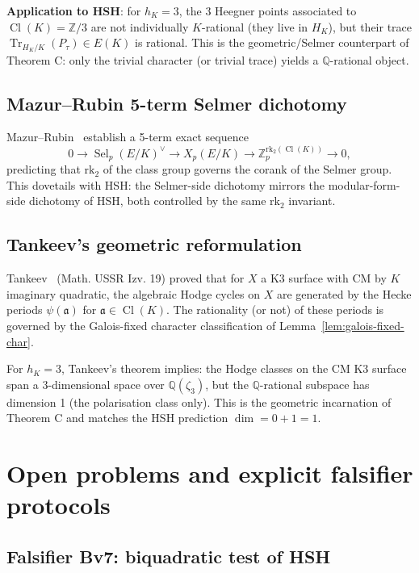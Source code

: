 \documentclass[11pt,a4paper]{amsart}
\theoremstyle{definition}
\DeclareMathOperator{\Tr}{Tr}
\DeclareMathOperator{\Cl}{Cl}
\DeclareMathOperator{\Sel}{Sel}
\newcommand{\Q}{\mathbb{Q}}
\newcommand{\Z}{\mathbb{Z}}
\newcommand{\fa}{\mathfrak{a}}
\newcommand{\hK}{h_{K}}
\newcommand{\rktwo}{\mathrm{rk}_2}
\begin{document}
\textbf{Application to HSH}: for $\hK = 3$, the 3 Heegner points associated to $\Cl(K) = \Z/3$ are not individually $K$-rational (they live in $H_K$), but their trace $\Tr_{H_K/K}(P_\tau) \in E(K)$ is rational. This is the geometric/Selmer counterpart of Theorem C: only the trivial character (or trivial trace) yields a $\Q$-rational object.

\subsection{Mazur--Rubin 5-term Selmer dichotomy}\label{sec:mazur-rubin}

Mazur--Rubin~\cite{MazurRubin2004} establish a 5-term exact sequence
\[
0 \to \Sel_p(E/K)^\vee \to X_p(E/K) \to \Z_p^{\rktwo(\Cl(K))} \to 0,
\]
predicting that $\rktwo$ of the class group governs the corank of the Selmer group. This dovetails with HSH: the Selmer-side dichotomy mirrors the modular-form-side dichotomy of HSH, both controlled by the same $\rktwo$ invariant.

\subsection{Tankeev's geometric reformulation}\label{sec:tankeev-v4}

Tankeev~\cite{Tankeev1982} (Math. USSR Izv. 19) proved that for $X$ a K3 surface with CM by $K$ imaginary quadratic, the algebraic Hodge cycles on $X$ are generated by the Hecke periods $\psi(\fa)$ for $\fa \in \Cl(K)$. The rationality (or not) of these periods is governed by the Galois-fixed character classification of Lemma~\ref{lem:galois-fixed-char}.

For $\hK = 3$, Tankeev's theorem implies: the Hodge classes on the CM K3 surface span a 3-dimensional space over $\Q(\zeta_3)$, but the $\Q$-rational subspace has dimension 1 (the polarisation class only). This is the geometric incarnation of Theorem C and matches the HSH prediction $\dim = 0 + 1 = 1$.


\section{Open problems and explicit falsifier protocols}\label{sec:openproblems}

\subsection{Falsifier Bv7: biquadratic test of HSH}\label{sec:falsifier-Bv7}
\end{document}
